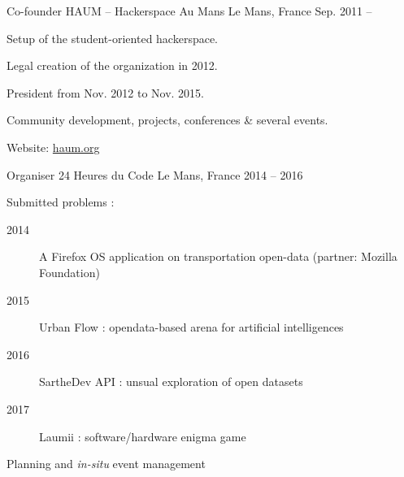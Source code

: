 

\begin{cventries}

  \cventry
    {Co-founder} %
    {HAUM -- Hackerspace Au Mans} %
    {Le Mans, France} %
    {Sep. 2011 --} %
    {
      \begin{cvitems} %
				\item {Setup of the student-oriented hackerspace.}
				\item {Legal creation of the organization in 2012.}
        \item {President from Nov. 2012 to Nov. 2015.}
				\item {Community development, projects, conferences \& several events.}
				\item {Website: \href{https://haum.org}{haum.org}}
      \end{cvitems}
    }

  \cventry
    {Organiser} %
    {24 Heures du Code} %
    {Le Mans, France} %
    {2014 -- 2016} %
    {
      \begin{cvitems} %
        \item {Submitted problems :
					\begin{description}
						\item[2014] A Firefox OS application on transportation open-data (partner: Mozilla Foundation)
						\item[2015] Urban Flow : opendata-based arena for artificial intelligences
						\item[2016] SartheDev API : unsual exploration of open datasets
						\item[2017] Laumii : software/hardware enigma game
					\end{description}
				}
				\item {Planning and \textit{in-situ} event management}
      \end{cvitems}
    }


\end{cventries}

